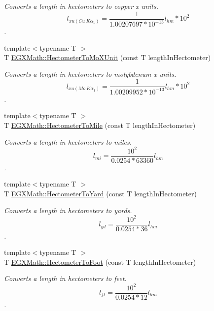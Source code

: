 \begin{DoxyCompactItemize}
\begin{DoxyCompactList}\small\item\em Converts a length in hectometers to copper x units. \[ l_{xu(Cu\ K\alpha_1)}= \frac{1}{1.00207697*10^{-13}} l_{hm} * 10^{2}\]. \end{DoxyCompactList}\item 
{\footnotesize template$<$typename T $>$ }\\T \mbox{\hyperlink{group___e_g_x_math-_conversions-_length_conversions-_s_i-_hectometer-_non-_s_i_gac2840604040746ae9a4c51fd1bb3e6f6}{E\+G\+X\+Math\+::\+Hectometer\+To\+Mo\+X\+Unit}} (const T length\+In\+Hectometer)
\begin{DoxyCompactList}\small\item\em Converts a length in hectometers to molybdenum x units. \[ l_{xu(Mo\ K\alpha_1)}=\frac{1}{1.00209952*10^{-13}} l_{hm} * 10^{2}\]. \end{DoxyCompactList}\item 
{\footnotesize template$<$typename T $>$ }\\T \mbox{\hyperlink{group___e_g_x_math-_conversions-_length_conversions-_s_i-_hectometer-_imperial_gabb3930dfb3335dc53303ec8ce9145d71}{E\+G\+X\+Math\+::\+Hectometer\+To\+Mile}} (const T length\+In\+Hectometer)
\begin{DoxyCompactList}\small\item\em Converts a length in hectometers to miles. \[ l_{mi}=\frac{10^{2}}{0.0254 * 63360} l_{hm} \]. \end{DoxyCompactList}\item 
{\footnotesize template$<$typename T $>$ }\\T \mbox{\hyperlink{group___e_g_x_math-_conversions-_length_conversions-_s_i-_hectometer-_imperial_ga84866f087daa74cdd00348f42462d13c}{E\+G\+X\+Math\+::\+Hectometer\+To\+Yard}} (const T length\+In\+Hectometer)
\begin{DoxyCompactList}\small\item\em Converts a length in hectometers to yards. \[ l_{yd}= \frac{10^{2}}{0.0254 * 36} l_{hm} \]. \end{DoxyCompactList}\item 
{\footnotesize template$<$typename T $>$ }\\T \mbox{\hyperlink{group___e_g_x_math-_conversions-_length_conversions-_s_i-_hectometer-_imperial_ga8b57e6e5bef662cc96b8b7dde68659a6}{E\+G\+X\+Math\+::\+Hectometer\+To\+Foot}} (const T length\+In\+Hectometer)
\begin{DoxyCompactList}\small\item\em Converts a length in hectometers to feet. \[ l_{ft}= \frac{10^{2}}{0.0254 * 12} l_{hm} \]. \end{DoxyCompactList}\item 

\end{DoxyCompactItemize}
